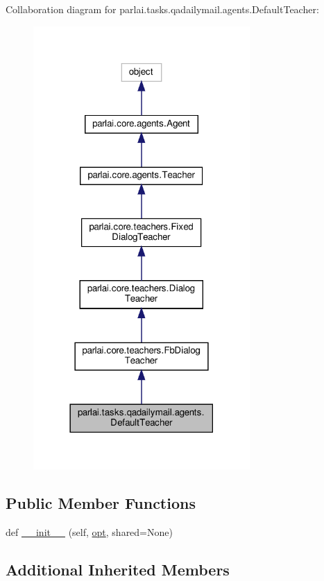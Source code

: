 Collaboration diagram for parlai.\+tasks.\+qadailymail.\+agents.\+Default\+Teacher\+:
\nopagebreak
\begin{figure}[H]
\begin{center}
\leavevmode
\includegraphics[width=234pt]{classparlai_1_1tasks_1_1qadailymail_1_1agents_1_1DefaultTeacher__coll__graph}
\end{center}
\end{figure}
\subsection*{Public Member Functions}
\begin{DoxyCompactItemize}
\item 
def \hyperlink{classparlai_1_1tasks_1_1qadailymail_1_1agents_1_1DefaultTeacher_a9b9a49fa6e1a61092205f2500fe4f933}{\+\_\+\+\_\+init\+\_\+\+\_\+} (self, \hyperlink{classparlai_1_1core_1_1teachers_1_1FbDialogTeacher_af7a9ec497b9cd0292d7b8fa220da7c28}{opt}, shared=None)
\end{DoxyCompactItemize}
\subsection*{Additional Inherited Members}


